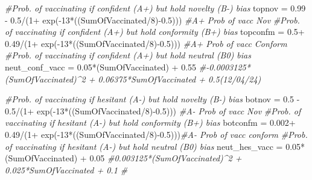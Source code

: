 \documentclass[
]{article}
\newenvironment{Shaded}{\begin{snugshade}}{\end{snugshade}}
\newcommand{\CommentTok}[1]{\textcolor[rgb]{0.56,0.35,0.01}{\textit{#1}}}
\newcommand{\DecValTok}[1]{\textcolor[rgb]{0.00,0.00,0.81}{#1}}
\newcommand{\FloatTok}[1]{\textcolor[rgb]{0.00,0.00,0.81}{#1}}
\newcommand{\FunctionTok}[1]{\textcolor[rgb]{0.00,0.00,0.00}{#1}}
\newcommand{\NormalTok}[1]{#1}
\newcommand{\OtherTok}[1]{\textcolor[rgb]{0.56,0.35,0.01}{#1}}
\newcommand{\SpecialCharTok}[1]{\textcolor[rgb]{0.00,0.00,0.00}{#1}}
\begin{document}
\begin{Shaded}
\begin{Highlighting}[]
\CommentTok{\#Prob. of vaccinating if confident (A+) but hold novelty (B{-}) bias}
\NormalTok{topnov }\OtherTok{=} \FloatTok{0.99} \SpecialCharTok{{-}} \FloatTok{0.5}\SpecialCharTok{/}\NormalTok{(}\DecValTok{1}\SpecialCharTok{+} \FunctionTok{exp}\NormalTok{(}\SpecialCharTok{{-}}\DecValTok{13}\SpecialCharTok{*}\NormalTok{((SumOfVaccinated}\SpecialCharTok{/}\DecValTok{8}\NormalTok{)}\SpecialCharTok{{-}}\FloatTok{0.5}\NormalTok{))) }\CommentTok{\#A+ Prob of vacc Nov}
\CommentTok{\#Prob. of vaccinating if confident (A+) but hold conformity (B+) bias}
\NormalTok{topconfm }\OtherTok{=} \FloatTok{0.5}\SpecialCharTok{+} \FloatTok{0.49}\SpecialCharTok{/}\NormalTok{(}\DecValTok{1}\SpecialCharTok{+} \FunctionTok{exp}\NormalTok{(}\SpecialCharTok{{-}}\DecValTok{13}\SpecialCharTok{*}\NormalTok{((SumOfVaccinated}\SpecialCharTok{/}\DecValTok{8}\NormalTok{)}\SpecialCharTok{{-}}\FloatTok{0.5}\NormalTok{))) }\CommentTok{\#A+ Prob of vacc Conform}
\CommentTok{\#Prob. of vaccinating if confident (A+) but hold neutral (B0) bias}
\NormalTok{neut\_conf\_vacc }\OtherTok{=} \FloatTok{0.05}\SpecialCharTok{*}\NormalTok{(SumOfVaccinated) }\SpecialCharTok{+} \FloatTok{0.55} \CommentTok{\#{-}0.0003125*(SumOfVaccinated)\^{}2 + 0.06375*SumOfVaccinated + 0.5(12/04/24)}

\CommentTok{\#Prob. of vaccinating if hesitant (A{-}) but hold novelty (B{-}) bias}
\NormalTok{botnov }\OtherTok{=} \FloatTok{0.5} \SpecialCharTok{{-}} \FloatTok{0.5}\SpecialCharTok{/}\NormalTok{(}\DecValTok{1}\SpecialCharTok{+} \FunctionTok{exp}\NormalTok{(}\SpecialCharTok{{-}}\DecValTok{13}\SpecialCharTok{*}\NormalTok{((SumOfVaccinated}\SpecialCharTok{/}\DecValTok{8}\NormalTok{)}\SpecialCharTok{{-}}\FloatTok{0.5}\NormalTok{))) }\CommentTok{\#A{-} Prob of vacc Nov}
\CommentTok{\#Prob. of vaccinating if hesitant (A{-}) but hold conformity (B+) bias}
\NormalTok{botconfm }\OtherTok{=} \FloatTok{0.002}\SpecialCharTok{+} \FloatTok{0.49}\SpecialCharTok{/}\NormalTok{(}\DecValTok{1}\SpecialCharTok{+} \FunctionTok{exp}\NormalTok{(}\SpecialCharTok{{-}}\DecValTok{13}\SpecialCharTok{*}\NormalTok{((SumOfVaccinated}\SpecialCharTok{/}\DecValTok{8}\NormalTok{)}\SpecialCharTok{{-}}\FloatTok{0.5}\NormalTok{)))}\CommentTok{\#A{-} Prob of vacc conform}
\CommentTok{\#Prob. of vaccinating if hesitant (A{-}) but hold neutral (B0) bias}
\NormalTok{neut\_hes\_vacc }\OtherTok{=} \FloatTok{0.05}\SpecialCharTok{*}\NormalTok{(SumOfVaccinated) }\SpecialCharTok{+} \FloatTok{0.05} \CommentTok{\#0.003125*(SumOfVaccinated)\^{}2 + 0.025*SumOfVaccinated + 0.1 \#}
\end{Highlighting}
\end{Shaded}
\end{document}
